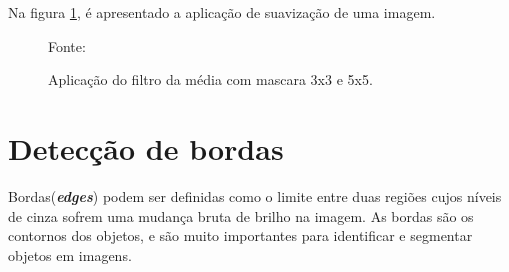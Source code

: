 Na figura \ref{subfig:suavizacao}, é apresentado a aplicação de suavização de uma imagem.

\begin{figure}[h]
 \centering
    \qquad
    \qquad
   \caption{ Aplicação do filtro da média com mascara 3x3 e 5x5.}
      Fonte: \cite{imagemDigital2019}
  \label{subfig:suavizacao}
\end{figure}

\section{Detecção de bordas}
\label{sec:bordas}

Bordas(\textit{\textbf{edges}}) podem ser definidas como o limite entre duas regiões cujos níveis de cinza sofrem uma mudança bruta de brilho na imagem. As bordas são os contornos dos objetos, e são muito importantes para identificar e segmentar objetos em imagens.\cite{digitalImgProcess2010}

